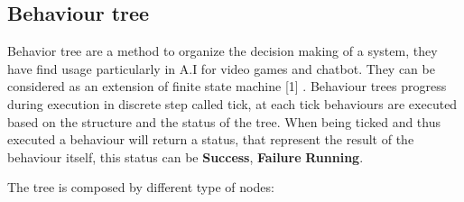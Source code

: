 \subsection*{Behaviour tree}
Behavior tree are a method to organize the decision making of a system, they have find usage particularly in A.I for
video games and chatbot. They can be considered as an extension of finite state machine [1] . 
Behaviour trees progress during execution in discrete step called tick, at each tick behaviours are executed based on
the structure and the status of the tree. When being ticked and thus executed a behaviour will return a status, that 
represent the result of the behaviour itself, this status can be \textbf{Success}, \textbf{Failure} \textbf{Running}.

The tree is  composed by different type of nodes: 

